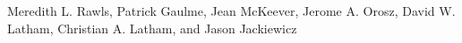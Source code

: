 Meredith L. Rawls, Patrick Gaulme, Jean McKeever, Jerome A. Orosz, David W. Latham, Christian A. Latham, and Jason Jackiewicz
  
  
  
  
